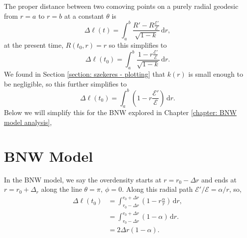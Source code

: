 \documentclass[a4paper,12pt]{report}
\newcommand{\diff}[1]{\,\text{d}{#1}}
\begin{document}
\begin{appendices}
The proper distance between two comoving points on a purely radial geodesic from $r=a$ to $r=b$ at a constant $\theta$ is
\begin{equation}
    \Delta \ell (t) = \int_a^b \frac{R'-R\frac{\mathcal{E}'}{\mathcal{E}}}{\sqrt{1-k}} \diff{r},
\end{equation}
at the present time, $R(t_0,r)=r$ so this simplifies to
\begin{equation}
    \Delta \ell (t_0) = \int_a^b \frac{1-r\frac{\mathcal{E}'}{\mathcal{E}}}{\sqrt{1-k}}\diff{r}.
\end{equation}
We found in Section \ref{section: szekeres - plotting} that $k(r)$ is small enough to be negligible, so this further simplifies to
\begin{equation}
    \Delta \ell (t_0) = \int_a^b \left(1-r\frac{\mathcal{E}'}{\mathcal{E}}\right) \diff{r}.
\end{equation}
Below we will simplify this for the BNW explored in Chapter \ref{chapter: BNW model analysis},

\section{BNW Model}
In the BNW model, we say the overdensity starts at $r=r_0-\Delta r$ and ends at $r=r_0+\Delta_r$ along the line $\theta=\pi,\: \phi=0$. Along this radial path $\mathcal{E}'/\mathcal{E} = \alpha/r$, so,
\begin{align}
    \Delta \ell (t_0) &= \int_{r_0-\Delta r}^{r_0+\Delta r} \left(1-r\frac{\alpha}{r}\right) \diff{r}, \\
    &= \int_{r_0-\Delta r}^{r_0+\Delta r} \left(1-\alpha\right) \diff{r}. \\
    &= 2 \Delta r \left(1-\alpha\right). \label{eqn: BNW Model thickness of overdensity back of the envelope}
\end{align}


\end{appendices}
\end{document}
